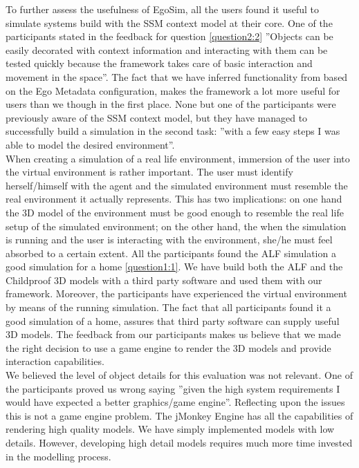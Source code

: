 To further assess the usefulness of EgoSim, all the users found it useful to simulate systems build with the SSM context model at their core. One of the participants stated in the feedback for question \ref{question2:2} ''Objects can be easily decorated with context information and interacting with them can be tested quickly because the framework takes care of basic interaction and movement in the space''. The fact that we have inferred functionality from based on the Ego Metadata configuration, makes the framework a lot more useful for users than we though in the first place. None but one of the participants were previously aware of the SSM context model, but they have managed to successfully build a simulation in the second task: ''with a few easy steps I was able to model the desired environment''.\\

When creating a simulation of a real life environment, immersion of the user into the virtual environment is rather important. The user must identify herself/himself with the agent and the simulated environment must resemble the real environment it actually represents. This has two implications: on one hand the 3D model of the environment must be good enough to resemble the real life setup of the simulated environment; on the other hand, the when the simulation is running and the user is interacting with the environment, she/he must feel absorbed to a certain extent. All the participants found the ALF simulation a good simulation for a home \ref{question1:1}. We have build both the ALF and the Childproof 3D models with a third party software and used them with our framework. Moreover, the participants have experienced the virtual environment by means of the running simulation. The fact that all participants found it a good simulation of a home, assures that third party software can supply useful 3D models. The feedback from our participants makes us believe that we made the right decision to use a game engine to render the 3D models and provide interaction capabilities.\\

We believed the level of object details for this evaluation was not relevant. One of the participants proved us wrong saying ''given the high system requirements I would have expected a better graphics/game engine''. Reflecting upon the issues this is not a game engine problem. The jMonkey Engine has all the capabilities of rendering high quality models. We have simply implemented models with low details. However, developing high detail models requires much more time invested in the modelling process.\\

